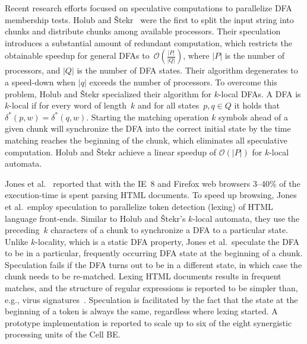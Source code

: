 \documentclass[10pt, conference, compsocconf]{IEEEtran}
\newcommand\States{\ensuremath{q}}
\newcommand\TF{\ensuremath{\delta}}
\newcommand\TFE{\ensuremath{\TF^*}}
\begin{document}
Recent research efforts focused on speculative computations to
parallelize DFA membership tests.
Holub and \v{S}tekr~\cite{Holub:2009} were the first to split the input
string into chunks and distribute chunks among available processors. Their
speculation introduces a substantial amount of redundant computation, which
restricts the obtainable speedup for general DFAs
to~$\mathcal{O}(\frac{\lvert P\rvert}{\lvert Q\rvert})$, where
$\lvert P\rvert$ is
the number of processors, and $\lvert Q\rvert$ is the number of DFA
states.
Their algorithm degenerates to a speed-down when
$|\States|$ exceeds the number of processors.
To overcome this problem, Holub and \v{S}tekr specialized their
algorithm for
$k$-local DFAs. A DFA is $k$-local if for every word of length~$k$ and
for all states~$p,q\in Q$ it holds that
$\TFE(p, w) = \TFE(q,w)$. Starting the matching operation $k$ symbols
ahead of a given
chunk will synchronize the DFA into the correct initial state by
the time matching reaches the beginning of the chunk, which eliminates
all speculative computation. Holub and  \v{S}tekr achieve
a linear speedup of $\mathcal{O}(\lvert P\rvert)$ for $k$-local automata.

Jones et al.~\cite{Jones2009} reported that with the IE~8 and Firefox
web browsers
3--40\% of the execution-time is spent parsing HTML documents. To speed
up browsing, Jones et al.\
employ speculation to parallelize token detection (lexing) of HTML
language front-ends.
Similar to Holub and \v{S}tekr's $k$-local automata, they use the
preceding~$k$
characters of a chunk to synchronize a DFA to a particular state.
Unlike $k$-locality,
which is a static DFA property, Jones et al.\
speculate the DFA to be in a particular, frequently occurring DFA state
at the beginning of a chunk. Speculation fails if the DFA turns
out to be in a different state, in which case the chunk
needs to be re-matched. Lexing HTML documents results in frequent
matches, and the structure of regular expressions is reported to be
simpler than, e.g., virus signatures~\cite{Luchaup2011}. Speculation is
facilitated by the fact that the state at the beginning
of a token is always the same, regardless where lexing started. A
prototype implementation is reported to scale up to six of the eight
synergistic processing units of the Cell BE.
\end{document}
